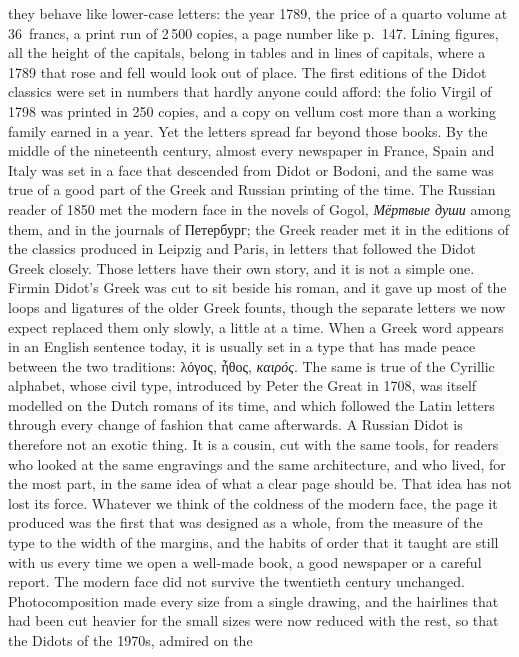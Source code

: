 \documentclass[10.5pt]{article}
\begin{document}
they behave like lower-case letters: the year 1789, the price of a quarto
volume at 36~francs, a print run of 2\,500 copies, a page number like p.~147.
Lining figures, all the height of the capitals, belong in tables and in lines
of capitals, where a 1789 that rose and fell would look out of place. The
first editions of the Didot classics were set in numbers that hardly anyone
could afford: the folio Virgil of 1798 was printed in 250 copies, and a copy on
vellum cost more than a working family earned in a year. Yet the letters
spread far beyond those books. By the middle of the nineteenth century, almost
every newspaper in France, Spain and Italy was set in a face that descended
from Didot or Bodoni, and the same was true of a good part of the Greek and
Russian printing of the time. The Russian reader of 1850 met the modern face in
the novels of Gogol, \emph{Мёртвые души} among them, and in the journals of
Петербург; the Greek reader met it in
the editions of the classics produced in Leipzig and Paris, in letters that
followed the Didot Greek closely. Those letters have their own story, and it
is not a simple one. Firmin Didot’s Greek was cut to sit beside his roman, and
it gave up most of the loops and ligatures of the older Greek founts, though
the separate letters we now expect replaced them only slowly, a little at a
time. When a Greek word appears in an English sentence today, it is usually
set in a type that has made peace between the two traditions: λόγος, ἦθος,
\emph{καιρός}. The same is true of the Cyrillic
alphabet, whose civil type, introduced by Peter the Great in 1708, was itself
modelled on the Dutch romans of its time, and which followed the Latin letters
through every change of fashion that came afterwards. A Russian Didot is
therefore not an exotic thing. It is a cousin, cut with the same tools, for
readers who looked at the same engravings and the same architecture, and who
lived, for the most part, in the same idea of what a clear page should be. That
idea has not lost its force. Whatever we think of the coldness of the modern
face, the page it produced was the first that was designed as a whole, from
the measure of the type to the width of the margins, and the habits of order
that it taught are still with us every time we open a well-made book, a good
newspaper or a careful report. The modern face did not survive the
twentieth century unchanged. Photocomposition made every size from a single
drawing, and the hairlines that had been cut heavier for the small sizes were
now reduced with the rest, so that the Didots of the 1970s, admired on the
\end{document}
